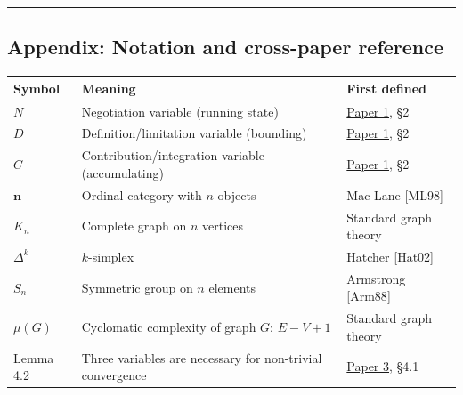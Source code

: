 \documentclass[
  11pt,
  letterpaper,
]{article}
\begin{document}
\begin{center}\rule{0.5\linewidth}{0.5pt}\end{center}

\subsection{Appendix: Notation and cross-paper
reference}\label{appendix-notation-and-cross-paper-reference}

\begin{longtable}[]{@{}
  >{\raggedright\arraybackslash}p{}
  >{\raggedright\arraybackslash}p{}
  >{\raggedright\arraybackslash}p{}@{}}
\toprule\noalign{}
\begin{minipage}[b]{\linewidth}\raggedright
Symbol
\end{minipage} & \begin{minipage}[b]{\linewidth}\raggedright
Meaning
\end{minipage} & \begin{minipage}[b]{\linewidth}\raggedright
First defined
\end{minipage} \\
\midrule\noalign{}
\endhead
\bottomrule\noalign{}
\endlastfoot
\(N\) & Negotiation variable (running state) &
\href{https://github.com/baardev/truevalue/blob/main/docnav/Research/papers/1_recursive-tholonic-five-constants/1_recursive-tholonic-five-constants.pdf}{Paper
1}, §2 \\
\(D\) & Definition/limitation variable (bounding) &
\href{https://github.com/baardev/truevalue/blob/main/docnav/Research/papers/1_recursive-tholonic-five-constants/1_recursive-tholonic-five-constants.pdf}{Paper
1}, §2 \\
\(C\) & Contribution/integration variable (accumulating) &
\href{https://github.com/baardev/truevalue/blob/main/docnav/Research/papers/1_recursive-tholonic-five-constants/1_recursive-tholonic-five-constants.pdf}{Paper
1}, §2 \\
\(\mathbf{n}\) & Ordinal category with \(n\) objects & Mac Lane
{[}ML98{]} \\
\(K_n\) & Complete graph on \(n\) vertices & Standard graph theory \\
\(\Delta^k\) & \(k\)-simplex & Hatcher {[}Hat02{]} \\
\(S_n\) & Symmetric group on \(n\) elements & Armstrong {[}Arm88{]} \\
\(\mu(G)\) & Cyclomatic complexity of graph \(G\): \(E - V + 1\) &
Standard graph theory \\
Lemma 4.2 & Three variables are necessary for non-trivial convergence &
\href{https://github.com/baardev/truevalue/blob/main/docnav/Research/papers/3_minimal-recursive-triadic-framework/3_minimal-recursive-triadic-framework.pdf}{Paper
3}, §4.1 \\
\end{longtable}
\end{document}
